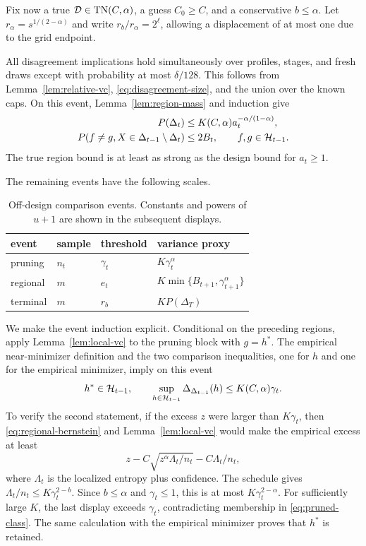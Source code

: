 Fix now a true $\mathcal D\in\mathrm{TN}(C,\alpha)$, a guess $C_0\geq C$, and a conservative $b\leq\alpha$. Let $r_\alpha=s^{1/(2-\alpha)}$ and write $r_b/r_\alpha=2^\ell$, allowing a displacement of at most one due to the grid endpoint.

All disagreement implications hold simultaneously over profiles, stages, and fresh draws except with probability at most $\delta/128$. This follows from Lemma~\ref{lem:relative-vc}, \eqref{eq:disagreement-size}, and the union over the known caps. On this event, Lemma~\ref{lem:region-mass} and induction give
\begin{align}
 P(\Delta_t)&\leq K(C,\alpha)a_t^{-\alpha/(1-\alpha)},
 \label{eq:true-region-mass}\\
 P(f\ne g,X\in\Delta_{t-1}\setminus\Delta_t)
 &\leq2B_t,\qquad f,g\in\mathcal H_{t-1}.
 \label{eq:design-disagreement}
\end{align}
The true region bound is at least as strong as the design bound for $a_t\geq1$.

The remaining events have the following scales.
\begin{table}[h]
\caption{Off-design comparison events. Constants and powers of $u+1$ are shown in the subsequent displays.}
\label{tab:event-scales}
\centering
\small
\begin{tabular}{llll}
\toprule
event & sample & threshold & variance proxy \\
\midrule
pruning & $n_t$ & $\gamma_t$ & $K\gamma_t^\alpha$ \\
regional & $m$ & $e_t$ & $K\min\{B_{t+1},\gamma_{t+1}^\alpha\}$ \\
terminal & $m$ & $r_b$ & $K P(\Delta_T)$ \\
\bottomrule
\end{tabular}
\end{table}

We make the event induction explicit. Conditional on the preceding regions, apply Lemma~\ref{lem:local-vc} to the pruning block with $g=h^*$. The empirical near-minimizer definition and the two comparison inequalities, one for $h$ and one for the empirical minimizer, imply on this event
\begin{equation}
 h^*\in\mathcal H_{t-1},\qquad
 \sup_{h\in\mathcal H_{t-1}}\Delta_{\Delta_{t-1}}(h)
 \leq K(C,\alpha)\gamma_t.
 \label{eq:pruning-transfer}
\end{equation}
To verify the second statement, if the excess $z$ were larger than $K\gamma_t$, then \eqref{eq:regional-bernstein} and Lemma~\ref{lem:local-vc} would make the empirical excess at least
\[
 z-C\sqrt{z^\alpha\Lambda_t/n_t}-C\Lambda_t/n_t,
\]
where $\Lambda_t$ is the localized entropy plus confidence. The schedule gives $\Lambda_t/n_t\leq K\gamma_t^{2-b}$. Since $b\leq\alpha$ and $\gamma_t\leq1$, this is at most $K\gamma_t^{2-\alpha}$. For sufficiently large $K$, the last display exceeds $\gamma_t$, contradicting membership in \eqref{eq:pruned-class}. The same calculation with the empirical minimizer proves that $h^*$ is retained.

